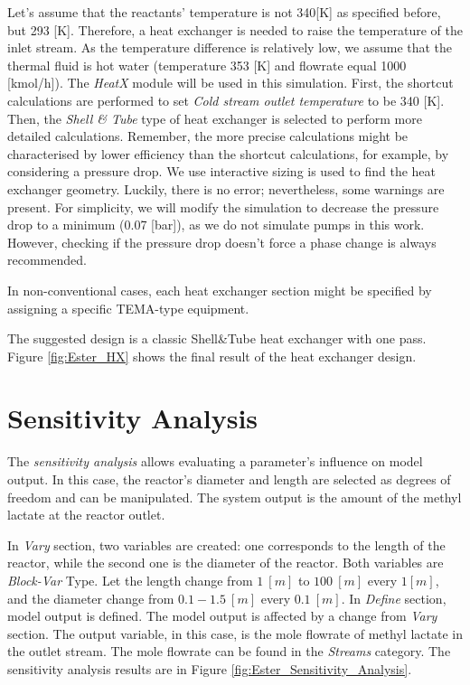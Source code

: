 Let's assume that the reactants' temperature is not 340[K] as specified before, but 293 [K]. Therefore, a heat exchanger is needed to raise the temperature of the inlet stream. As the temperature difference is relatively low, we assume that the thermal fluid is hot water (temperature 353 [K] and flowrate equal 1000 [kmol/h]). The \textit{HeatX} module will be used in this simulation. First, the shortcut calculations are performed to set \textit{Cold stream outlet temperature} to be 340 [K]. Then, the \textit{Shell \& Tube} type of heat exchanger is selected to perform more detailed calculations. Remember, the more precise calculations might be characterised by lower efficiency than the shortcut calculations, for example, by considering a pressure drop.
We use interactive sizing is used to find the heat exchanger geometry. Luckily, there is no error; nevertheless, some warnings are present. For simplicity, we will modify the simulation to decrease the pressure drop to a minimum (0.07 [bar]), as we do not simulate pumps in this work. However, checking if the pressure drop doesn't force a phase change is always recommended.

In non-conventional cases, each heat exchanger section might be specified by assigning a specific TEMA-type equipment.

The suggested design is a classic Shell\&Tube heat exchanger with one pass. Figure \ref{fig:Ester_HX} shows the final result of the heat exchanger design.

\section{Sensitivity Analysis}

The \textit{sensitivity analysis} allows evaluating a parameter's influence on model output. In this case, the reactor's diameter and length are selected as degrees of freedom and can be manipulated. The system output is the amount of the methyl lactate at the reactor outlet.

In \textit{Vary} section, two variables are created: one corresponds to the length of the reactor, while the second one is the diameter of the reactor. Both variables are \textit{Block-Var} Type. Let the length change from $1~[m]$ to $100~[m]$ every $1[m]$, and the diameter change from $0.1-1.5~[m]$ every $0.1~[m]$.
In \textit{Define} section, model output is defined. The model output is affected by a change from \textit{Vary} section. The output variable, in this case, is the mole flowrate of methyl lactate in the outlet stream. The mole flowrate can be found in the \textit{Streams} category. The sensitivity analysis results are in Figure \ref{fig:Ester_Sensitivity_Analysis}.

